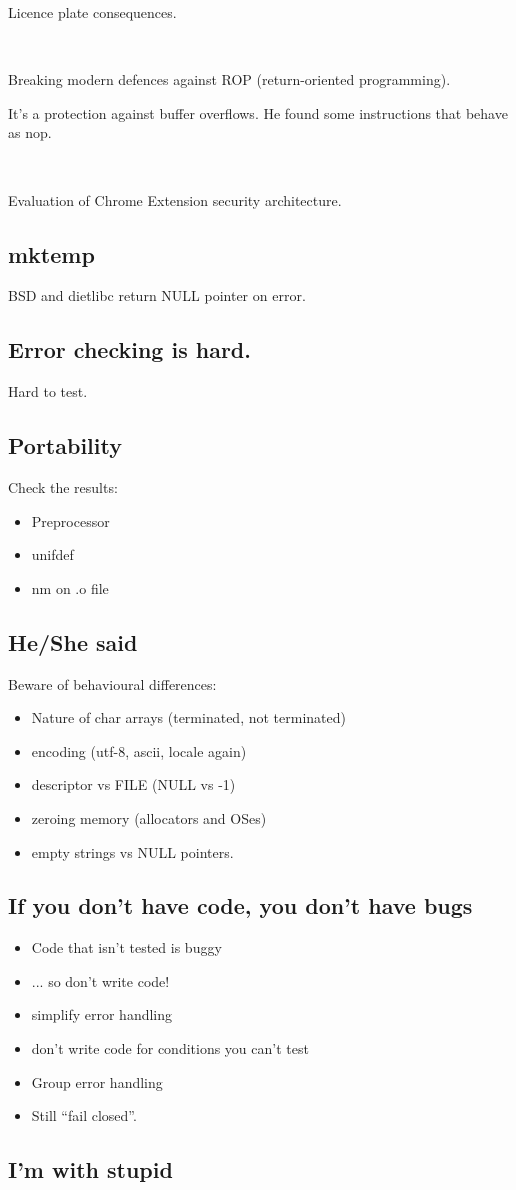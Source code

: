 \documentclass[a4paper,11pt]{article}
\newcommand{\ls}{\begin{itemize}}
\newcommand{\li}{\item}
\newcommand{\lend}{\end{itemize}}
\begin{document}
Licence plate consequences.

\

Breaking modern defences against ROP (return-oriented programming).

It's a protection against buffer overflows. He found some instructions that
behave as nop.

\

Evaluation of Chrome Extension security architecture.

\subsection{mktemp}

BSD and dietlibc return NULL pointer on error.

\subsection{Error checking is hard.}

Hard to test.

\subsection{Portability}

Check the results:

\ls
\li Preprocessor
\li unifdef
\li nm on .o file
\lend

\subsection{He/She said}

Beware of behavioural differences:

\ls
\li Nature of char arrays (terminated, not terminated)
\li encoding (utf-8, ascii, locale again)
\li descriptor vs FILE (NULL vs -1)
\li zeroing memory (allocators and OSes)
\li empty strings vs NULL pointers.
\lend

\subsection{If you don't have code, you don't have bugs}

\ls
\li Code that isn't tested is buggy
\li ... so don't write code!
\li simplify error handling
\li don't write code for conditions you can't test
\li Group error handling
\li Still ``fail closed''.
\lend

\subsection{I'm with stupid}
\end{document}
